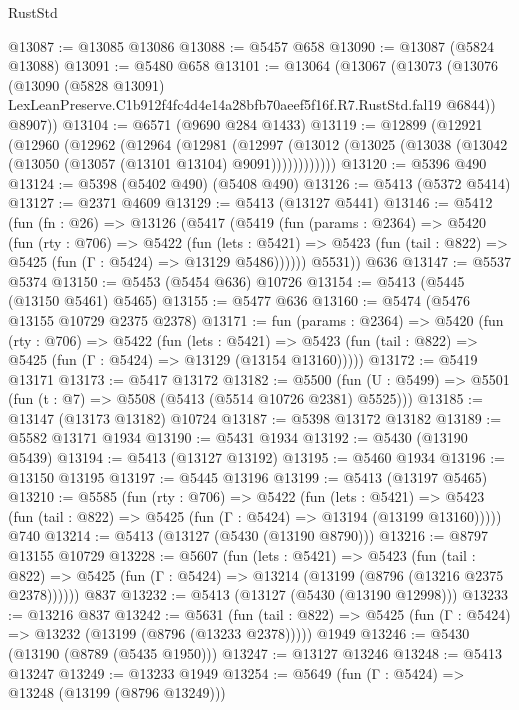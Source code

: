 \begin{lexlean}{RustStd}
\begin{coremodule}
@13087 := @13085 @13086
@13088 := @5457 @658
@13090 := @13087 (@5824 @13088)
@13091 := @5480 @658
@13101 := @13064
    (@13067
      (@13073
        (@13076
          (@13090
            (@5828 @13091)
            LexLeanPreserve.C1b912f4fc4d4e14a28bfb70aeef5f16f.R7.RustStd.fal19
            @6844))
        @8907))
@13104 := @6571 (@9690 @284 @1433)
@13119 := @12899
    (@12921
      (@12960
        (@12962
          (@12964
            (@12981
              (@12997
                (@13012 (@13025 (@13038 (@13042 (@13050 (@13057 (@13101 @13104) @9091))))))))))))
@13120 := @5396 @490
@13124 := @5398 (@5402 @490) (@5408 @490)
@13126 := @5413 (@5372 @5414)
@13127 := @2371 @4609
@13129 := @5413 (@13127 @5441)
@13146 := @5412
    (fun (fn : @26) =>
    @13126
      (@5417
        (@5419
          (fun (params : @2364) =>
          @5420
            (fun (rty : @706) =>
            @5422
              (fun (lets : @5421) =>
              @5423 (fun (tail : @822) => @5425 (fun (Γ : @5424) => @13129 @5486))))))
        @5531))
    @636
@13147 := @5537 @5374
@13150 := @5453 (@5454 @636) @10726
@13154 := @5413 (@5445 (@13150 @5461) @5465)
@13155 := @5477 @636
@13160 := @5474 (@5476 @13155 @10729 @2375 @2378)
@13171 := fun (params : @2364) =>
  @5420
    (fun (rty : @706) =>
    @5422
      (fun (lets : @5421) =>
      @5423 (fun (tail : @822) => @5425 (fun (Γ : @5424) => @13129 (@13154 @13160)))))
@13172 := @5419 @13171
@13173 := @5417 @13172
@13182 := @5500
    (fun (U : @5499) => @5501 (fun (t : @7) => @5508 (@5413 (@5514 @10726 @2381) @5525)))
@13185 := @13147 (@13173 @13182) @10724
@13187 := @5398 @13172 @13182
@13189 := @5582 @13171 @1934
@13190 := @5431 @1934
@13192 := @5430 (@13190 @5439)
@13194 := @5413 (@13127 @13192)
@13195 := @5460 @1934
@13196 := @13150 @13195
@13197 := @5445 @13196
@13199 := @5413 (@13197 @5465)
@13210 := @5585
    (fun (rty : @706) =>
    @5422
      (fun (lets : @5421) =>
      @5423 (fun (tail : @822) => @5425 (fun (Γ : @5424) => @13194 (@13199 @13160)))))
    @740
@13214 := @5413 (@13127 (@5430 (@13190 @8790)))
@13216 := @8797 @13155 @10729
@13228 := @5607
    (fun (lets : @5421) =>
    @5423
      (fun (tail : @822) =>
      @5425 (fun (Γ : @5424) => @13214 (@13199 (@8796 (@13216 @2375 @2378))))))
    @837
@13232 := @5413 (@13127 (@5430 (@13190 @12998)))
@13233 := @13216 @837
@13242 := @5631
    (fun (tail : @822) => @5425 (fun (Γ : @5424) => @13232 (@13199 (@8796 (@13233 @2378)))))
    @1949
@13246 := @5430 (@13190 (@8789 (@5435 @1950)))
@13247 := @13127 @13246
@13248 := @5413 @13247
@13249 := @13233 @1949
@13254 := @5649 (fun (Γ : @5424) => @13248 (@13199 (@8796 @13249)))

\end{coremodule}
\end{lexlean}
